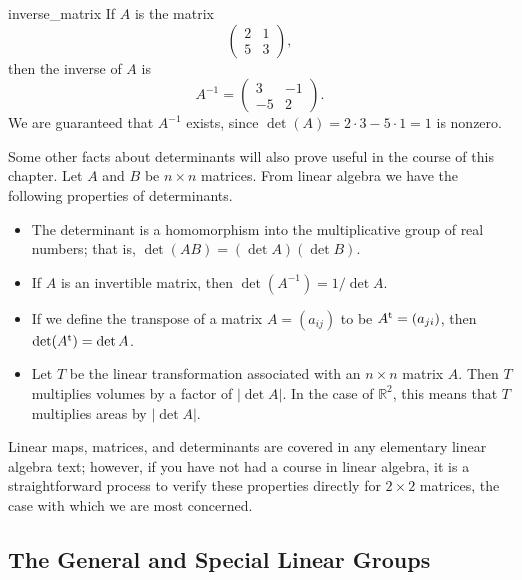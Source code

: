  
\begin{example}{inverse_matrix}
If $A$ is the matrix
\[
\begin{pmatrix}
2 & 1 \\
5 & 3
\end{pmatrix},
\]
then the inverse of $A$ is
\[
A^{-1} =
\begin{pmatrix}
3 & -1 \\
-5 & 2
\end{pmatrix}.
\]
We are guaranteed  that $A^{-1}$ exists, since $\det(A) = 2 \cdot 3 - 5
\cdot 1 = 1$ is nonzero. \mbox{\hspace*{1in}}
\end{example}
 
 
Some other facts about determinants will also prove useful in the
course of this chapter.   Let $A$ and $B$ be $n \times n$ matrices.
From linear algebra we have the following properties of determinants.
\begin{itemize}
 
\item
The determinant is a homomorphism into the multiplicative group of
real numbers; that is, $\det( A B) = (\det A )(\det B)$. 
 
\item
If $A$ is an invertible matrix, then $\det(A^{-1}) = 1 / \det A$.
 
\item
If we define the transpose  of a matrix $A = (a_{ij})$ to be $A^{\rm
t} = (a_{ji})$, then $\det(A^{\rm t}) = \det A$. 
 
\item
Let $T$ be the linear transformation associated with an $n \times n$
matrix $A$. Then $T$ multiplies volumes by a factor of $|\det A|$. In
the case of ${\mathbb R}^2$, this means that $T$ multiplies areas by
$|\det A|$.
 
\end{itemize}
 
 
Linear maps, matrices, and determinants are covered in any elementary
linear algebra text; however, if you have not had a course in linear
algebra, it is a straightforward process to verify these properties
directly for $2 \times 2$ matrices, the case with which we are most
concerned. 
 
 
 
\subsection*{The General and Special Linear Groups}
 

